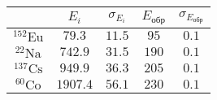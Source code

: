 \begin{tabular}{| c | c | c | c | c |}
\hline
{} & $E_i$ & $\sigma_{E_i}$ & $E_{обр}$ & $\sigma_{E_{обр}}$\\
\hline
$^{152}\text{Eu}$ & $79.3$ & $11.5$ & $95$ & $0.1$\\
\hline
$^{22}\text{Na}$ & $742.9$ & $31.5$ & $190$ & $0.1$\\
\hline
$^{137}\text{Cs}$ & $949.9$ & $36.3$ & $205$ & $0.1$\\
\hline
$^{60}\text{Co}$ & $1907.4$ & $56.1$ & $230$ & $0.1$\\
\hline
\end{tabular}
